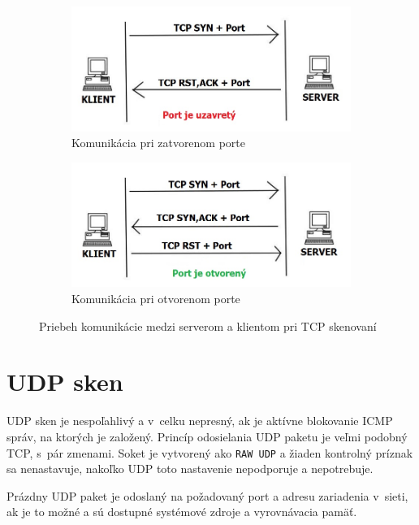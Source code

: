 \begin{figure}[H]
	\centering
	\begin{subfigure}{.5\textwidth}
		\centering
		\includegraphics[width=0.375\paperwidth]{obrazky-figures/tcp-closed.jpg}
		\caption{Komunikácia pri zatvorenom porte}
		\label{fig:tcp-clos}
	\end{subfigure}%
	\begin{subfigure}{.5\textwidth}
		\centering
		\includegraphics[width=0.375\paperwidth]{obrazky-figures/tcp-open.jpg}
		\caption{Komunikácia pri otvorenom porte}
		\label{fig:tcp-open}
	\end{subfigure}
	\caption{Priebeh komunikácie medzi serverom a klientom pri TCP skenovaní}
	\label{fig:tcp}
\end{figure}


\section{UDP sken}
UDP sken je nespoľahlivý a v~celku nepresný, ak je aktívne blokovanie ICMP správ, na ktorých je založený. Princíp odosielania UDP paketu je veľmi podobný TCP, s~pár zmenami. Soket je vytvorený ako \texttt{RAW UDP} a žiaden kontrolný príznak sa nenastavuje, nakoľko UDP toto nastavenie nepodporuje a nepotrebuje. 

Prázdny UDP paket je odoslaný na požadovaný port a adresu zariadenia v~sieti, ak je to možné a sú dostupné systémové zdroje a vyrovnávacia pamäť.

